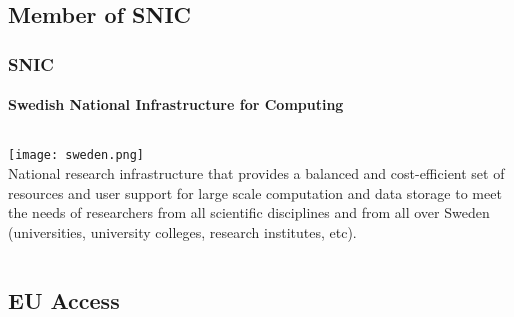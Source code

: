 \subsection*{Member of SNIC}

\frame
{
\frametitle{SNIC}
\framesubtitle{Swedish National Infrastructure for Computing}
\begin{columns}
\texttt{[image: sweden.png]}\\
National \alert{research infrastructure} that provides a \alert{balanced and cost-efficient} set of \alert{resources and user support} for \alert{large scale computation and data storage} to meet the needs of researchers from all scientific disciplines and from all over Sweden (universities, university colleges, research institutes, etc).
\end{columns}
}



\subsection*{EU Access}


